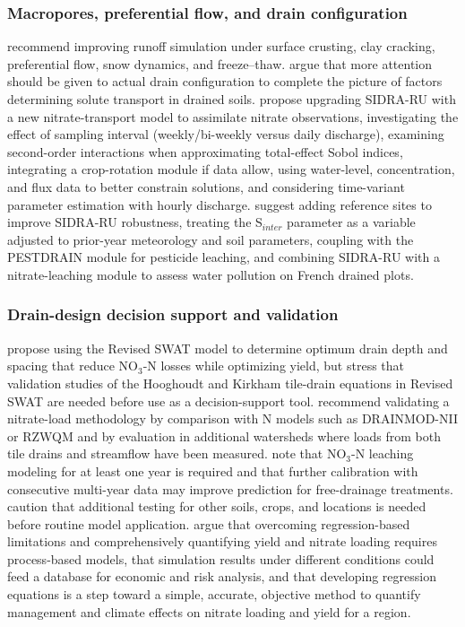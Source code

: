 \subsubsection{Macropores, preferential flow, and drain configuration}
\textcite{Smith2020} recommend improving runoff simulation under surface crusting, clay cracking, preferential flow, snow dynamics, and freeze--thaw. \textcite{Stamm2002} argue that more attention should be given to actual drain configuration to complete the picture of factors determining solute transport in drained soils. \textcite{Chelil2022b} propose upgrading SIDRA-RU with a new nitrate-transport model to assimilate nitrate observations, investigating the effect of sampling interval (weekly/bi-weekly versus daily discharge), examining second-order interactions when approximating total-effect Sobol indices, integrating a crop-rotation module if data allow, using water-level, concentration, and flux data to better constrain solutions, and considering time-variant parameter estimation with hourly discharge. \textcite{Jeantet2021} suggest adding reference sites to improve SIDRA-RU robustness, treating the S$_{inter}$ parameter as a variable adjusted to prior-year meteorology and soil parameters, coupling with the PESTDRAIN module for pesticide leaching, and combining SIDRA-RU with a nitrate-leaching module to assess water pollution on French drained plots.

\subsubsection{Drain-design decision support and validation}
\textcite{Moriasi2013} propose using the Revised SWAT model to determine optimum drain depth and spacing that reduce NO$_3$-N losses while optimizing yield, but stress that validation studies of the Hooghoudt and Kirkham tile-drain equations in Revised SWAT are needed before use as a decision-support tool. \textcite{Ale2012} recommend validating a nitrate-load methodology by comparison with N models such as DRAINMOD-NII or RZWQM and by evaluation in additional watersheds where loads from both tile drains and streamflow have been measured. \textcite{Ng2000} note that NO$_3$-N leaching modeling for at least one year is required and that further calibration with consecutive multi-year data may improve prediction for free-drainage treatments. \textcite{Skaggs1995} caution that additional testing for other soils, crops, and locations is needed before routine model application. \textcite{Malone2007} argue that overcoming regression-based limitations and comprehensively quantifying yield and nitrate loading requires process-based models, that simulation results under different conditions could feed a database for economic and risk analysis, and that developing regression equations is a step toward a simple, accurate, objective method to quantify management and climate effects on nitrate loading and yield for a region.

